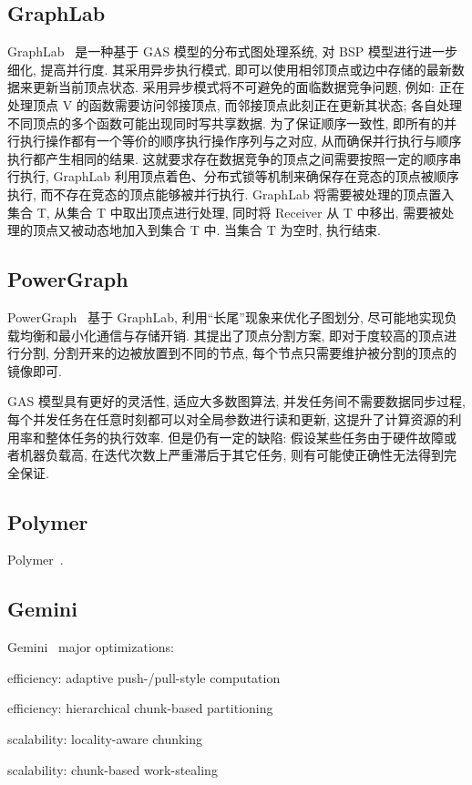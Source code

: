 \documentclass[UTF8,12pt,a4paper]{article}
\begin{document}
\subsection{GraphLab}
GraphLab~\cite{DBLP:journals/pvldb/LowGKBGH12}
是一种基于 GAS 模型的分布式图处理系统,
对 BSP 模型进行进一步细化, 提高并行度.
其采用异步执行模式, 即可以使用相邻顶点或边中存储的最新数据来更新当前顶点状态.
采用异步模式将不可避免的面临数据竞争问题, 例如:
正在处理顶点 V 的函数需要访问邻接顶点,
而邻接顶点此刻正在更新其状态;
各自处理不同顶点的多个函数可能出现同时写共享数据.
为了保证顺序一致性, 即所有的并行执行操作都有一个等价的顺序执行操作序列与之对应,
从而确保并行执行与顺序执行都产生相同的结果.
这就要求存在数据竞争的顶点之间需要按照一定的顺序串行执行,
GraphLab 利用顶点着色、分布式锁等机制来确保存在竞态的顶点被顺序执行,
而不存在竞态的顶点能够被并行执行.
GraphLab 将需要被处理的顶点置入集合 T, 从集合 T 中取出顶点进行处理,
同时将 Receiver 从 T 中移出, 需要被处理的顶点又被动态地加入到集合 T 中.
当集合 T 为空时, 执行结束.

\subsection{PowerGraph}
PowerGraph~\cite{DBLP:conf/osdi/GonzalezLGBG12}
基于 GraphLab, 利用``长尾''现象来优化子图划分,
尽可能地实现负载均衡和最小化通信与存储开销.
其提出了顶点分割方案, 即对于度较高的顶点进行分割,
分割开来的边被放置到不同的节点, 每个节点只需要维护被分割的顶点的镜像即可.

GAS 模型具有更好的灵活性, 适应大多数图算法,
并发任务间不需要数据同步过程, 每个并发任务在任意时刻都可以对全局参数进行读和更新,
这提升了计算资源的利用率和整体任务的执行效率.
但是仍有一定的缺陷: 假设某些任务由于硬件故障或者机器负载高,
在迭代次数上严重滞后于其它任务, 则有可能使正确性无法得到完全保证.

\subsection{Polymer}
Polymer~\cite{DBLP:conf/ppopp/ZhangCC15}.

\subsection{Gemini}
Gemini~\cite{DBLP:conf/osdi/ZhuCZM16} major optimizations:
\begin{compactitem}
  \item efficiency: adaptive push-/pull-style computation
  \item efficiency: hierarchical chunk-based	partitioning
  \item scalability: locality-aware	chunking
  \item scalability: chunk-based work-stealing
\end{compactitem}
\end{document}
